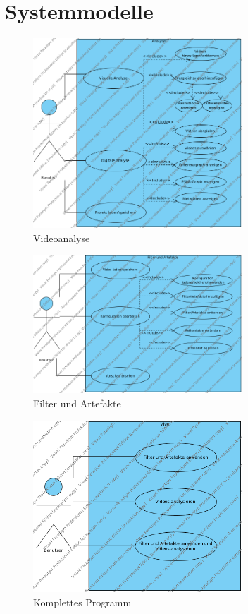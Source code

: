 \documentclass[parskip=full]{scrartcl}
\begin{document}
\section{Systemmodelle}
\begin{figure}[htbp]
\centering
\includegraphics[width=0.7\textwidth]{UsecaseDiagrams/Analyse.png}
\caption{Videoanalyse}
\end{figure}
\begin{figure}[htbp]
\centering
\includegraphics[width=0.7\textwidth]{UsecaseDiagrams/Filter_und_Artefakte.png}
\caption{Filter und Artefakte}
\end{figure}
\begin{figure}[htbp]
\centering
\includegraphics[width=0.7\textwidth]{UsecaseDiagrams/Vive.png}
\caption{Komplettes Programm}
\end{figure}
\newpage
\end{document}
